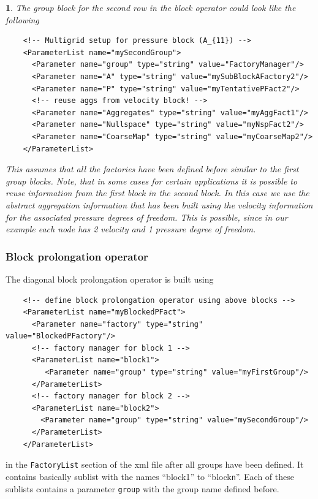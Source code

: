 \documentclass[10pt,fleqn]{book}
\newtheorem*{mycomment}{\ding{42}}
\begin{document}
\begin{mycomment}
The group block for the second row in the block operator could look like the following
\begin{lstlisting}
    <!-- Multigrid setup for pressure block (A_{11}) -->
    <ParameterList name="mySecondGroup">
      <Parameter name="group" type="string" value="FactoryManager"/>
      <Parameter name="A" type="string" value="mySubBlockAFactory2"/>
      <Parameter name="P" type="string" value="myTentativePFact2"/>
      <!-- reuse aggs from velocity block! -->
      <Parameter name="Aggregates" type="string" value="myAggFact1"/>
      <Parameter name="Nullspace" type="string" value="myNspFact2"/>
      <Parameter name="CoarseMap" type="string" value="myCoarseMap2"/>
    </ParameterList>
\end{lstlisting}
This assumes that all the factories have been defined before similar to the first group blocks. Note, that in some cases for certain applications it is possible to reuse information from the first block in the second block. In this case we use the abstract aggregation information that has been built using the velocity information for the associated pressure degrees of freedom. This is possible, since in our example each node has 2 velocity and 1 pressure degree of freedom.
\end{mycomment}

\subsubsection{Block prolongation operator}

The diagonal block prolongation operator is built using 
\begin{lstlisting}
    <!-- define block prolongation operator using above blocks -->
    <ParameterList name="myBlockedPFact">
      <Parameter name="factory" type="string" value="BlockedPFactory"/>
      <!-- factory manager for block 1 -->
      <ParameterList name="block1">
         <Parameter name="group" type="string" value="myFirstGroup"/>
      </ParameterList>
      <!-- factory manager for block 2 -->
      <ParameterList name="block2">
        <Parameter name="group" type="string" value="mySecondGroup"/>
      </ParameterList>
    </ParameterList>
\end{lstlisting}
in the \texttt{FactoryList} section of the xml file after all groups have been defined. It contains basically sublist with the names ``block1'' to ``block\texttt{n}''. Each of these sublists contains a parameter \texttt{group} with the group name defined before.
\end{document}
